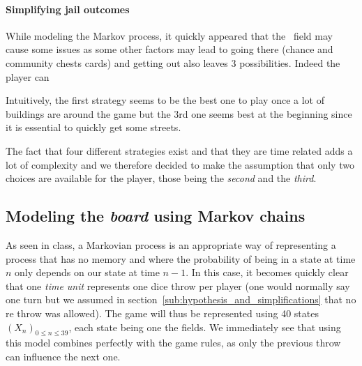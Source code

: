 \paragraph{Simplifying jail outcomes} %
\label{par:simplifying jail}
While modeling the Markov process, it quickly appeared that the \jail~field
may cause some issues as some other factors may lead to going there (chance
and community chests cards) and getting out also leaves 3 possibilities.
Indeed the player can~\cite[p.18]{mit_course_notes}
Intuitively, the first strategy seems to be the best one to play once a lot
of buildings are around the game but the 3rd one seems best at the beginning
since it is essential to quickly get some streets.

The fact that four different strategies exist and that they are time related
adds a lot of complexity and we therefore decided to make the assumption that
only two choices are available for the player,
those being the \emph{second} and the \emph{third}.



\newpage
\subsection{Modeling the \emph{board} using Markov chains} %
\label{sub:modeling_using_markov_chains}
As seen in class, a Markovian process is an appropriate way of representing a process
that has no memory and where the probability of being in a state at time $n$
only depends on our state at time $n-1$.
In this case, it becomes quickly clear that one \emph{time unit} represents one dice throw
per player (one would normally say one turn but
we assumed in section~\ref{sub:hypothesis_and_simplifications} that no
re throw was allowed).
The game will thus be represented using 40 states $(X_n)_{0\leq n\leq39}$,
each state being one the fields.
We immediately see that using this model combines perfectly with the game rules,
as only the previous throw can influence the next one.

